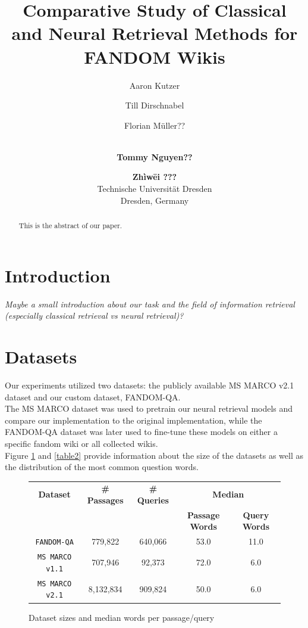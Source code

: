 \documentclass[11pt]{article}
\title{
Comparative Study of Classical and Neural Retrieval Methods for FANDOM Wikis
}
\author{
Aaron Kutzer \and Till Dirschnabel \and Florian Müller?? \and \\
{\bf Tommy Nguyen??} \and {\bf Zhìwēi ???} \\
Technische Universität Dresden \\ Dresden, Germany
}
\begin{document}
\maketitle
\begin{abstract}
This is the abstract of our paper.
\end{abstract}


\section{Introduction}
\textit{Maybe a small introduction about our task and the field of information retrieval (especially classical retrieval vs neural retrieval)?}


\section{Datasets}
Our experiments utilized two datasets: the publicly available MS MARCO v2.1 \cite{bajaj2018ms} dataset and our custom dataset, FANDOM-QA. \\
The MS MARCO dataset was used to pretrain our neural retrieval models and compare our implementation to the original implementation, while the FANDOM-QA dataset was later used to fine-tune these models on either a specific fandom wiki or all collected wikis. \\
Figure \ref{table1} and \ref{table2} provide information about the size of the datasets as well as the distribution of the most common question words.

\begin{figure}
    \centering

    \caption{Dataset sizes and median words per passage/query}
    \setlength{\tabcolsep}{4pt} %
    \begin{tabular}{ccccc}
    \hline
    \textbf{Dataset} & \textbf{\# Passages} & \textbf{\# Queries} & \multicolumn{2}{c}{\textbf{Median}} \\
    & & & \textbf{Passage Words} & \textbf{Query Words} \\
    \hline
    \texttt{FANDOM-QA} & 779,822 & 640,066 & 53.0 & 11.0 \\
    \texttt{MS MARCO v1.1} & 707,946 & 92,373 & 72.0 & 6.0 \\
    \texttt{MS MARCO v2.1} & 8,132,834 & 909,824 & 50.0 & 6.0 \\
    \hline
    \end{tabular}
        \label{table1}
\end{figure}
\end{document}
